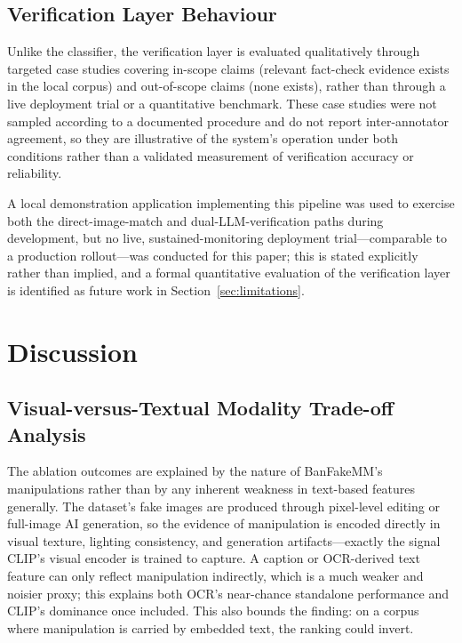 \documentclass[conference,a4paper]{IEEEtran}
\begin{document}
\subsection{Verification Layer Behaviour}

Unlike the classifier, the verification layer is evaluated qualitatively
through targeted case studies covering in-scope claims (relevant fact-check
evidence exists in the local corpus) and out-of-scope claims (none exists),
rather than through a live deployment trial or a quantitative benchmark. These
case studies were not sampled according to a documented procedure and do not
report inter-annotator agreement, so they are illustrative of the system's
operation under both conditions rather than a validated measurement of
verification accuracy or reliability.

A local demonstration application implementing this pipeline was used to
exercise both the direct-image-match and dual-LLM-verification paths during
development, but no live, sustained-monitoring deployment trial---comparable
to a production rollout---was conducted for this paper; this is stated
explicitly rather than implied, and a formal quantitative evaluation of the
verification layer is identified as future work in
Section~\ref{sec:limitations}.


\section{Discussion}

\subsection{Visual-versus-Textual Modality Trade-off Analysis}

The ablation outcomes are explained by the nature of BanFakeMM's manipulations
rather than by any inherent weakness in text-based features generally. The
dataset's fake images are produced through pixel-level editing or full-image
AI generation, so the evidence of manipulation is encoded directly in visual
texture, lighting consistency, and generation artifacts---exactly the signal
CLIP's visual encoder is trained to capture. A caption or OCR-derived text
feature can only reflect manipulation indirectly, which is a much weaker and
noisier proxy; this explains both OCR's near-chance standalone performance and
CLIP's dominance once included. This also bounds the finding: on a corpus
where manipulation is carried by embedded text, the ranking could invert.
\end{document}
